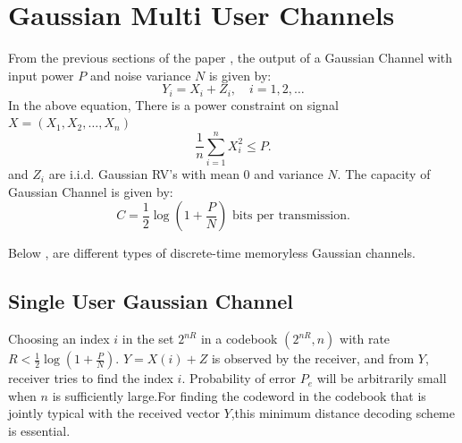 \section{Gaussian Multi User Channels}
From the previous sections of the paper , the output of a Gaussian Channel with input power \( P \) and noise variance \( N \) is given by:
\begin{equation}
Y_i = X_i + Z_i, \quad i = 1, 2, \ldots
\end{equation}
In the above equation, There is a power constraint on signal \( X = (X_1, X_2, \ldots, X_n) \) 
\begin{equation}
\frac{1}{n} \sum_{i=1}^n X_i^2 \leq P.
\end{equation}
 and \( Z_i \) are i.i.d. Gaussian RV's with mean 0 and variance \( N \). 
The capacity of Gaussian Channel is given by:
\begin{equation}
C = \frac{1}{2} \log \left( 1 + \frac{P}{N} \right) \text{ bits per transmission.}
\end{equation}

Below , are different types of discrete-time memoryless Gaussian channels.

\subsection{Single User Gaussian Channel}
Choosing an index \( i \) in the set \( 2^{nR} \) in a codebook \( (2^{nR}, n) \) with rate \( R < \frac{1}{2} \log(1 + \frac{P}{N}) \). \( Y = X(i) + Z \) is observed by the receiver, and from \( Y \), receiver tries to find the index \( i \).
Probability of error \( P_e\) will be arbitrarily small when \( n \) is sufficiently large.For finding the codeword in the codebook that is jointly typical with the received vector \( Y \),this minimum distance decoding scheme is essential.

